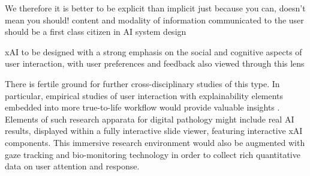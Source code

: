 We therefore it is better to be explicit than implicit
just because you can, doesn't mean you should!
content and modality of information communicated to the user should be a first class citizen in AI system design



  

xAI to be designed with a strong emphasis on the social and cognitive aspects of user interaction, with user preferences and feedback also viewed through this lens



There is fertile ground for further cross-disciplinary studies of this type. In particular, empirical studies of user interaction with explainability elements embedded into more true-to-life workflow would provide valuable insights . Elements of such research apparata for digital pathology might include real AI results, displayed within a fully interactive slide viewer, featuring interactive xAI components. This immersive research environment would also be augmented with gaze tracking and bio-monitoring technology in order to collect rich quantitative data on user attention and response. 

